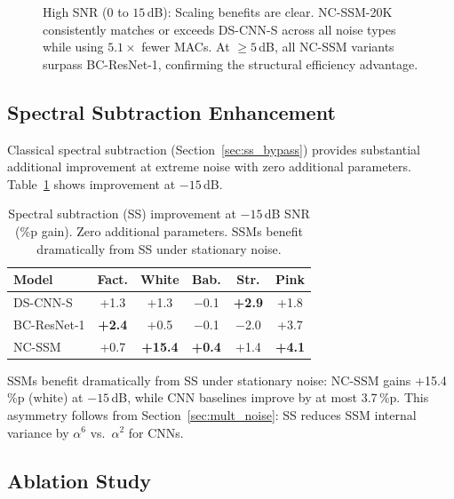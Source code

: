 \documentclass[journal]{IEEEtran}
\begin{document}
\begin{figure}[t]
\caption{High SNR ($0$ to $15$\,dB): Scaling benefits are clear. NC-SSM-20K consistently matches or exceeds DS-CNN-S across all noise types while using $5.1\times$ fewer MACs. At $\geq 5$\,dB, all NC-SSM variants surpass BC-ResNet-1, confirming the structural efficiency advantage.}
\label{fig:snr_high}
\end{figure}


\subsection{Spectral Subtraction Enhancement}

Classical spectral subtraction (Section~\ref{sec:ss_bypass}) provides substantial additional improvement at extreme noise with zero additional parameters. Table~\ref{tab:ss_bypass} shows improvement at $-15$\,dB.

\begin{table}[t]
\centering
\caption{Spectral subtraction (SS) improvement at $-15$\,dB SNR (\%p gain). Zero additional parameters. SSMs benefit dramatically from SS under stationary noise.}
\label{tab:ss_bypass}
\small
\begin{tabular}{lccccc}
\toprule
\textbf{Model} & \textbf{Fact.} & \textbf{White} & \textbf{Bab.} & \textbf{Str.} & \textbf{Pink} \\
\midrule
DS-CNN-S    & +1.3 & +1.3 & $-$0.1 & \textbf{+2.9} & +1.8 \\
BC-ResNet-1 & \textbf{+2.4} & +0.5 & $-$0.1 & $-$2.0 & +3.7 \\
\midrule
NC-SSM      & +0.7 & \textbf{+15.4} & \textbf{+0.4} & +1.4 & \textbf{+4.1} \\
\bottomrule
\end{tabular}
\end{table}

SSMs benefit dramatically from SS under stationary noise: NC-SSM gains +15.4\,\%p (white) at $-15$\,dB, while CNN baselines improve by at most 3.7\,\%p.
This asymmetry follows from Section~\ref{sec:mult_noise}: SS reduces SSM internal variance by $\alpha^6$ vs.\ $\alpha^2$ for CNNs.


\subsection{Ablation Study}
\label{sec:ablation}
\end{document}
